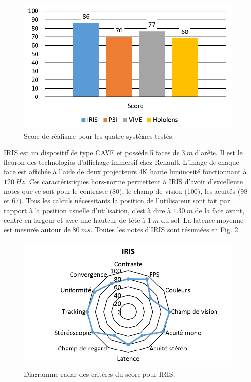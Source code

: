 \begin{figure}[h]
	\centering
	\includegraphics[scale=1]{Figures/ResultatsScoreApplication}
	\caption{Score de réalisme pour les quatre systèmes testés.}
	\label{fig:resultats_score_application}
\end{figure}

\par IRIS est un dispositif de type CAVE et possède 5 faces de $3~m$ d'arête. Il est le fleuron des technologies d'affichage immersif chez Renault. L'image de chaque face est affichée à l'aide de deux projecteurs 4K haute luminosité fonctionnant à $120~Hz$. Ces caractéristiques hors-norme permettent à IRIS d'avoir d'excellente notes que ce soit pour le contraste (80), le champ de vision (100), les acuités (98 et 67). Tous les calculs nécessitants la position de l'utilisateur sont fait par rapport à la position usuelle d'utilisation, c'est à dire à $1.30~m$ de la face avant, centré en largeur et avec une hauteur de tête à $1~m$ du sol. La latence moyenne est mesurée autour de $80~ms$. Toutes les notes d'IRIS sont résumées en Fig. \ref{fig:radar_score_iris}.

\begin{figure}[h]
	\centering
	\includegraphics[scale=1]{Figures/RadarScoreIRIS}
	\caption{Diagramme radar des critères du score pour IRIS.}
	\label{fig:radar_score_iris}
\end{figure}

